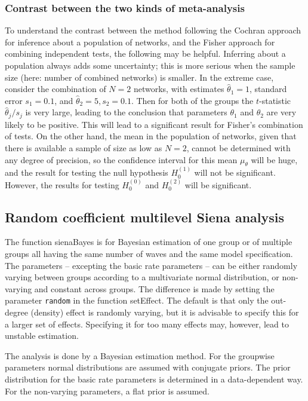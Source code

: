\documentclass[a4paper,fleqn,11pt]{article}
\newcommand{\+}{\, + \,}
\newcommand{\sfn}[1]{\textsf{#1}}
\begin{document}
\subsubsection{Contrast between the two kinds of meta-analysis }

To understand the contrast between the method following the Cochran approach
for inference about a population of networks,
and the Fisher approach for combining independent tests, the following
may be helpful.
Inferring about a population always adds some uncertainty;
this is more serious when the sample size (here: number of combined networks)
is smaller.
In the extreme case, consider the combination of $N=2$ networks,
with estimates $\hat\theta_1 = 1$, standard error $s_1 = 0.1$,
and $\hat\theta_2 = 5, s_2 = 0.1$.
Then for both of the groups the $t$-statistic $\hat\theta_j/s_j$ is very large,
leading to the conclusion that parameters $\theta_1$ and $\theta_2$
are very likely to be positive.
This will lead to a significant result for Fisher's combination of tests.
On the other hand, the mean in the population of networks, given that
there is available a sample of size as low as $N=2$, cannot be determined with
any degree of precision, so the confidence interval for this mean $\mu_\theta$
will be huge, and the result for testing the null hypothesis
$H_0^{(1)}$ will not be significant.
However, the results for testing $H_0^{(0)}$ and $H_0^{(2)}$
will be significant.


\subsection{Random coefficient multilevel Siena analysis}
\label{S_sienaBayes}

  The function \sfn{sienaBayes} is for Bayesian estimation of one group or
  of multiple groups all having the same number of waves and the same
  model specification.
  The parameters -- excepting the basic rate parameters -- can be either
  randomly varying between groups according to a multivariate
  normal distribution, or non-varying and constant across groups.
  The difference is made by setting the parameter \texttt{random} in 
  the function \sfn{setEffect}. The default is that only the out-degree (density)
  effect is randomly varying, but it is advisable to specify
  this for a larger set of effects.
  Specifying it for too many effects may, however, lead to unstable estimation.
  
  The analysis is done by a Bayesian estimation method.
  For the groupwise parameters normal distributions are assumed with conjugate
  priors. The prior distribution for the basic rate parameters is determined
  in a data-dependent way. For the non-varying parameters,
  a flat prior is assumed.
  
\end{document}
